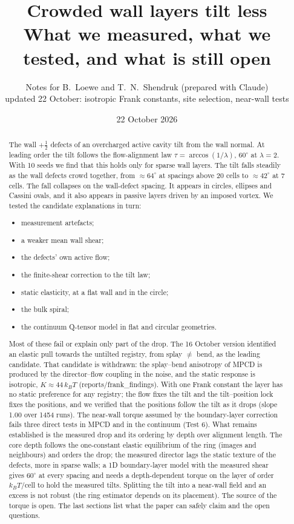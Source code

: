 \documentclass[11pt,a4paper]{article}
\title{Crowded wall layers tilt less\\[2pt]\large What we measured, what we tested, and what is still open}
\author{Notes for B.~Loewe and T.~N.~Shendruk (prepared with Claude)\\ \small updated 22 October: isotropic Frank constants, site selection, near-wall tests}
\date{22 October 2026}
\newcommand{\half}{\tfrac12}
\newcommand{\kT}{k_BT}
\begin{document}
\maketitle

\begin{abstract}
The wall $+\half$ defects of an overcharged active cavity tilt from the wall normal. At leading order the tilt follows the flow-alignment law $\tau=\arccos(1/\lambda)$, $60^\circ$ at $\lambda=2$. With 10 seeds we find that this holds only for sparse wall layers. The tilt falls steadily as the wall defects crowd together, from $\approx64^\circ$ at spacings above 20 cells to $\approx42^\circ$ at 7 cells. The fall collapses on the wall-defect spacing. It appears in circles, ellipses and Cassini ovals, and it also appears in passive layers driven by an imposed vortex. We tested the candidate explanations in turn:
\begin{itemize}
\item measurement artefacts;
\item a weaker mean wall shear;
\item the defects' own active flow;
\item the finite-shear correction to the tilt law;
\item static elasticity, at a flat wall and in the circle;
\item the bulk spiral;
\item the continuum Q-tensor model in flat and circular geometries.
\end{itemize}
Most of these fail or explain only part of the drop. The 16 October version identified an elastic pull towards the untilted registry, from
splay $\neq$ bend, as the leading candidate. That candidate is withdrawn: the splay--bend anisotropy of MPCD is produced by the director--flow coupling
in the noise, and the static response is isotropic, $K\approx44\,\kT$ (reports/frank\_findings). With one Frank constant the layer has no static
preference for any registry; the flow fixes the tilt and the tilt--position lock fixes the positions, and we verified that the positions follow the
tilt as it drops (slope 1.00 over 1454 runs). The near-wall torque assumed by the boundary-layer correction fails three direct tests in MPCD and in the
continuum (Test 6). What remains established is the measured drop and its ordering by depth over alignment length. The core depth follows the one-constant elastic equilibrium of the ring
(images and neighbours) and orders the drop; the measured director lags the static texture of the defects, more in sparse walls; a 1D boundary-layer
model with the measured shear gives $60^\circ$ at every spacing and needs a depth-dependent torque on the layer of order $\kT$/cell to hold the measured
tilts. Splitting the tilt into a near-wall field and an excess is not robust (the ring estimator depends on its placement). The source of the torque is open. The last sections list
what the paper can safely claim and the open questions.
\end{abstract}
\end{document}

